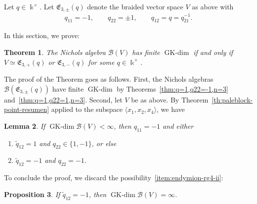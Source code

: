 \documentclass[10pt,a4paper]{amsart}
\numberwithin{equation}{section}
\newtheorem{Theorem}{Theorem}[section]
\newtheorem{Lemma}[Theorem]{Lemma}
\newtheorem{Proposition}[Theorem]{Proposition}
 { \theoremstyle{definition}
\newtheorem{Definition}[Theorem]{Definition}
\newtheorem{Note}[Theorem]{Note}
\newtheorem{Example}[Theorem]{Example}
\newtheorem{Remark}[Theorem]{Remark} }
\newcommand{\GK}{\operatorname{GK-dim}}
\newcommand{\toba}{\mathscr B}
\newcommand{\eny}{\mathfrak{E}}
\begin{document}
Let $q \in \Bbbk^{\times}$.
Let $\eny_{3,\pm}(q)$ denote the braided vector space $V$ as above with
\begin{align*}
q_{11}= -1, \qquad q_{22} = \pm 1, \qquad q_{12} = q= q_{21}^{-1}.
\end{align*}

In this section, we prove:

\begin{Theorem} \label{th:large-block-point} The Nichols algebra
$\toba (V)$ has finite $\GK$ if and only if $V\simeq \eny_{3,+}(q)$ or $\eny_{3,-}(q)$ for some $q \in \Bbbk^{\times}$.
\end{Theorem}

The proof of the Theorem goes as follows.
First, the Nichols algebras $\toba(\eny_{3,\pm}(q))$ have finite $\GK$ by Theorems~\ref{thm:q=1,q22=-1,n=3} and~\ref{thm:q=1,q22=1,n=3}.
Second, let $V$ be as above.
By Theorem~\ref{th:paleblock-point-resumen} applied to the subspace
$\langle x_1, x_2, x_{4}\rangle$, we have

\begin{Lemma}
If $\GK \toba (V) < \infty$, then $q_{11} = -1$ and either
\begin{enumerate}[label=$(\roman*)$]\itemsep=0pt
\item\label{item:endymion-rg4-i}
$\widetilde{q}_{12} = 1$ and $q_{22} \in \big\{1, -1 \big\}$, or else

\item\label{item:endymion-rg4-ii}
$\widetilde{q}_{12} = -1$ and $q_{22} = -1$.
\end{enumerate}
\end{Lemma}

To conclude the proof, we discard the possibility~\ref{item:endymion-rg4-ii}:

\begin{Proposition} %
If $\widetilde{q}_{12}=-1$, then $\GK \toba(V) = \infty$.
\end{Proposition}
\end{document}
